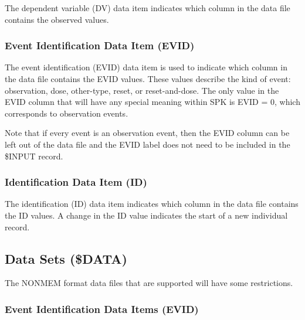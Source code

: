 \documentclass{article}
\begin{document}
The dependent variable (DV) data item indicates which column in 
the data file contains the observed values.


\subsubsection{Event Identification Data Item (EVID)}

The event identification (EVID) data item is used to indicate which
column in the data file contains the EVID values.
These values describe the kind of event: observation, dose, 
other-type, reset, or reset-and-dose.
The only value in the EVID column that will have any special meaning
within SPK is EVID = 0, which corresponds to observation events.

Note that if every event is an observation event, then
the EVID column can be left out of the data file and the EVID label
does not need to be included in the \$INPUT record.


\subsubsection{Identification Data Item (ID)}

The identification (ID) data item indicates which column in 
the data file contains the ID values.
A change in the ID value indicates the start of a new
individual record.


\subsection{Data Sets (\$DATA)}

The NONMEM format data files that are supported will have some 
restrictions.


\subsubsection{Event Identification Data Items (EVID)}
\end{document}
